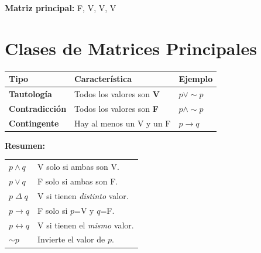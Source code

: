 \documentclass[12pt,a4paper]{article}
\begin{document}
\textbf{Matriz principal:} F, V, V, V

\section{Clases de Matrices Principales}

\begin{center}
\begin{tabular}{>{\bfseries}lll}
\toprule
Tipo & Característica & Ejemplo \\
\midrule
Tautología    & Todos los valores son \textbf{V} & $p \vee \sim p$ \\
Contradicción & Todos los valores son \textbf{F} & $p \wedge \sim p$ \\
Contingente   & Hay al menos un V y un F         & $p \rightarrow q$ \\
\bottomrule
\end{tabular}
\end{center}

\vspace{4pt}

\begin{definicion}
\textbf{Resumen:}\\[4pt]
\begin{tabular}{@{}ll@{}}
$p \wedge q$           & V solo si ambas son V.\\
$p \vee q$             & F solo si ambas son F.\\
$p \;\Delta\; q$       & V si tienen \emph{distinto} valor.\\
$p \rightarrow q$      & F solo si $p$=V y $q$=F.\\
$p \leftrightarrow q$  & V si tienen el \emph{mismo} valor.\\
$\sim p$               & Invierte el valor de $p$.\\
\end{tabular}
\end{definicion}
\end{document}
